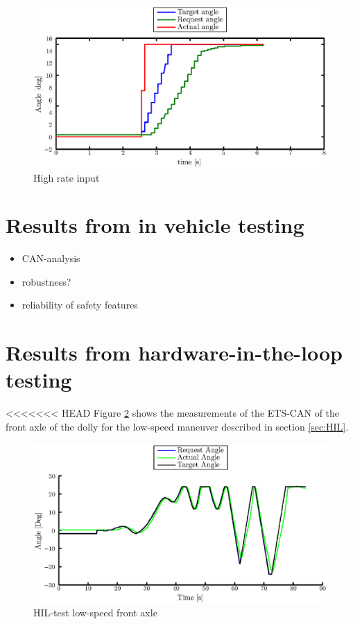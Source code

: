 \documentclass[ExampleMasters.tex]{subfiles}
\begin{document}
\begin{figure}[h]
	\centering
	\includegraphics[width=1\linewidth]{figures/rate_limiter4}
	\caption{High rate input}
	
	\label{fig:rate_limiter4}
\end{figure}


\section{Results from in vehicle testing}
\label{sec:results_vehicle_testing}

\begin{itemize}
	\item CAN-analysis
	\item robustness?
	\item reliability of safety features
\end{itemize}
\section{Results from hardware-in-the-loop testing}
<<<<<<< HEAD
Figure \ref{fig:HIL002_front} shows the measurements of the ETS-CAN of the front axle of the dolly for the low-speed maneuver described in section \ref{sec:HIL}.\\

\begin{figure}[!htb]
	\centering
	\includegraphics[width=1\linewidth]{figures/HIL002_front}
	\caption{HIL-test low-speed front axle}
	
	\label{fig:HIL002_front}
\end{figure}
\end{document}
